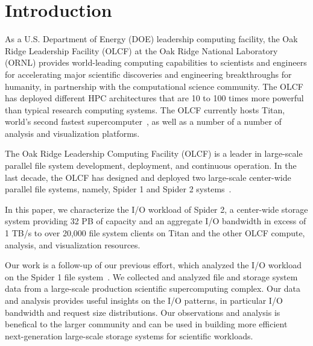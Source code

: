 \section{Introduction}
\label{sec:intro}

As a U.S. Department of Energy (DOE) leadership computing facility, the Oak
Ridge Leadership Facility (OLCF) at the Oak Ridge National Laboratory (ORNL)
provides world-leading computing capabilities to scientists and engineers for
accelerating major scientific discoveries and engineering breakthroughs for
humanity, in partnership with the computational science community. The OLCF has
deployed different HPC architectures that are 10 to 100 times more powerful
than typical research computing systems. The OLCF currently hosts Titan,
world's second fastest supercomputer~\cite{titan}, as well as a number of a
number of analysis and visualization platforms.


The Oak Ridge Leadership Computing Facility (OLCF) is a leader in large-scale
parallel file system development, deployment, and continuous operation. In the
last decade, the OLCF has designed and deployed two large-scale center-wide
parallel file systems, namely, Spider 1 and Spider 2 systems~\cite{spider1,
spider2}. 

In this paper, we characterize the I/O workload of Spider 2, a center-wide
storage system providing 32 PB of capacity and an aggregate I/O bandwidth in
excess of 1 TB/s to over 20,000 file system clients on Titan and the other OLCF
compute, analysis, and visualization resources. 

Our work is a follow-up of our previous effort, which analyzed the I/O workload
on the Spider 1 file system~\cite{spider1-workload}. We collected and analyzed
file and storage system data from a large-scale production scientific
supercomputing complex. Our data and analysis provides useful insights on the
I/O patterns, in particular I/O bandwidth and request size distributions. Our
observations and analysis is benefical to the larger community and can be used
in building more efficient next-generation large-scale storage systems for
scientific workloads.  
